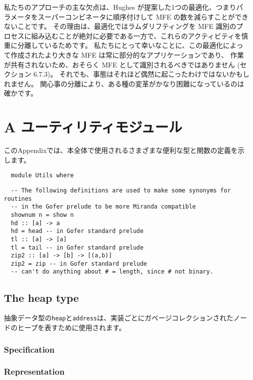 \documentclass{jarticle}
\begin{document}
私たちのアプローチの主な欠点は、Hughes が提案した1つの最適化、つまりパラメータをスーパーコンビネータに順序付けして MFE の数を減らすことができないことです。
その理由は、最適化ではラムダリフティングを MFE 識別のプロセスに組み込むことが絶対に必要である一方で、これらのアクティビティを慎重に分離しているためです。
私たちにとって幸いなことに、この最適化によって作成されたより大きな MFE は常に部分的なアプリケーションであり、
作業が共有されないため、おそらく MFE として識別されるべきではありません (セクション 6.7.3)。
それでも、事態はそれほど偶然に起こったわけではないかもしれません。
関心事の分離により、ある種の変革がかなり困難になっているのは確かです。
\newpage

\section{A ユーティリティモジュール}

このAppendixでは、本全体で使用されるさまざまな便利な型と関数の定義を示します。

\begin{verbatim}
  module Utils where
\end{verbatim}

\begin{verbatim}
  -- The following definitions are used to make some synonyms for routines
  -- in the Gofer prelude to be more Miranda compatible
  shownum n = show n
  hd :: [a] -> a
  hd = head -- in Gofer standard prelude
  tl :: [a] -> [a]
  tl = tail -- in Gofer standard prelude
  zip2 :: [a] -> [b] -> [(a,b)]
  zip2 = zip -- in Gofer standard prelude
  -- can't do anything about # = length, since # not binary.
\end{verbatim}

\subsection{The heap type}

抽象データ型の\texttt{heap}と\texttt{address}は、実装ごとにガベージコレクションされたノードのヒープを表すために使用されます。

\subsubsection{Specification}
\subsubsection{Representation}
\newpage
\end{document}
